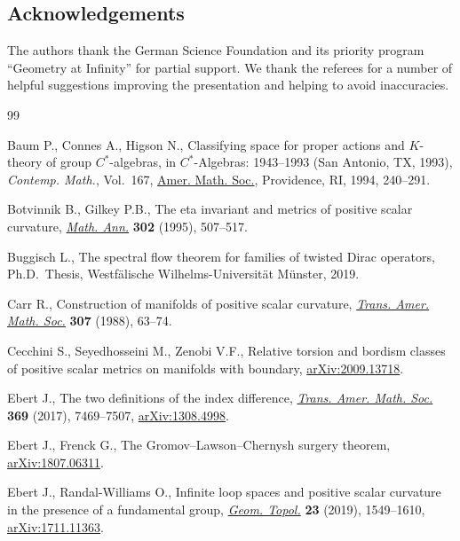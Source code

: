 \documentclass[pdftex]{sigma}
\numberwithin{equation}{section}
\begin{document}
\subsection*{Acknowledgements}
The authors thank the German Science Foundation and its priority program ``Geometry at Infinity'' for partial support. We thank the
referees for a number of helpful suggestions improving the presentation and helping to avoid inaccuracies.

\begin{thebibliography}{99}
\footnotesize\itemsep=0pt

Baum P., Connes A., Higson N., Classifying space for proper actions and
 {$K$}-theory of group {$C^\ast$}-algebras, in {$C^\ast$}-Algebras: 1943--1993
 ({S}an {A}ntonio, {TX}, 1993), \textit{Contemp. Math.}, Vol.~167, \href{https://doi.org/10.1090/conm/167/1292018}{Amer. Math.
 Soc.}, Providence, RI, 1994, 240--291.

Botvinnik B., Gilkey P.B., The eta invariant and metrics of positive scalar
 curvature, \href{https://doi.org/10.1007/BF01444505}{\textit{Math. Ann.}} \textbf{302} (1995), 507--517.

Buggisch L., The spectral flow theorem for families of twisted {D}irac
 operators, Ph.D.~Thesis, {W}estf\"alische Wilhelms-Universit\"at M\"unster,
 2019.

Carr R., Construction of manifolds of positive scalar curvature, \href{https://doi.org/10.2307/2000751}{\textit{Trans.
 Amer. Math. Soc.}} \textbf{307} (1988), 63--74.

Cecchini S., Seyedhosseini M., Zenobi V.F., Relative torsion and bordism
 classes of positive scalar metrics on manifolds with boundary,
 \href{https://arxiv.org/abs/2009.13718}{arXiv:2009.13718}.

Ebert J., The two definitions of the index difference, \href{https://doi.org/10.1090/tran/7133}{\textit{Trans. Amer.
 Math. Soc.}} \textbf{369} (2017), 7469--7507, \href{https://arxiv.org/abs/1308.4998}{arXiv:1308.4998}.

Ebert J., Frenck G., The Gromov--Lawson--Chernysh surgery theorem,
 \href{https://arxiv.org/abs/1807.06311}{arXiv:1807.06311}.

Ebert J., Randal-Williams O., Infinite loop spaces and positive scalar
 curvature in the presence of a fundamental group, \href{https://doi.org/10.2140/gt.2019.23.1549}{\textit{Geom. Topol.}}
 \textbf{23} (2019), 1549--1610, \href{https://arxiv.org/abs/1711.11363}{arXiv:1711.11363}.


\end{thebibliography}
\end{document}
